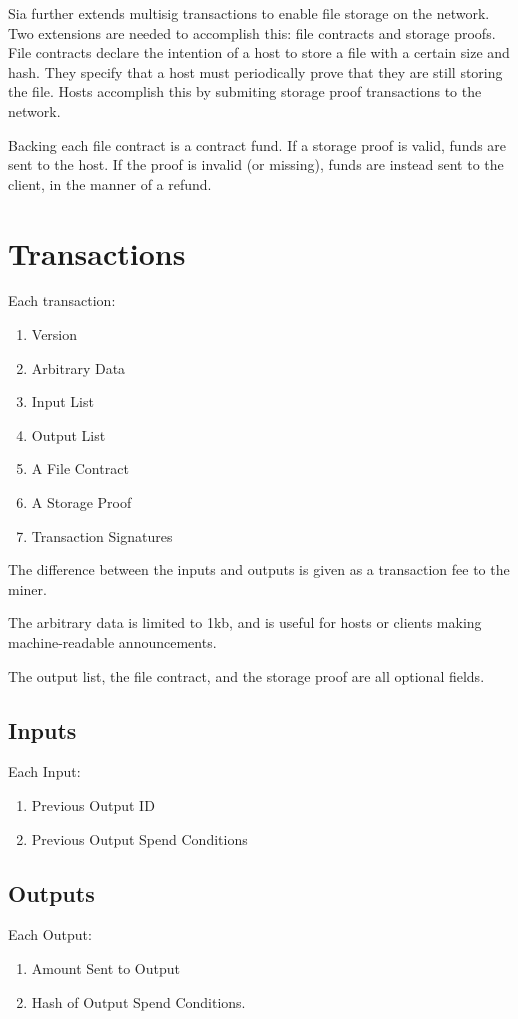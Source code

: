 \documentclass[twocolumn]{article}
\begin{document}
Sia further extends multisig transactions to enable file storage on the network.
Two extensions are needed to accomplish this: file contracts and storage proofs.
File contracts declare the intention of a host to store a file with a certain size and hash.
They specify that a host must periodically prove that they are still storing the file.
Hosts accomplish this by submiting storage proof transactions to the network.

Backing each file contract is a contract fund.
If a storage proof is valid, funds are sent to the host.
If the proof is invalid (or missing), funds are instead sent to the client, in the manner of a refund.

\section{Transactions}
Each transaction:
\begin{enumerate}
	\item Version
	\item Arbitrary Data
	\item Input List
	\item Output List
	\item A File Contract
	\item A Storage Proof
	\item Transaction Signatures
\end{enumerate}

The difference between the inputs and outputs is given as a transaction fee to the miner.

The arbitrary data is limited to 1kb, and is useful for hosts or clients making machine-readable announcements.

The output list, the file contract, and the storage proof are all optional fields.

\subsection{Inputs}
Each Input:
\begin{enumerate}
	\item Previous Output ID
	\item Previous Output Spend Conditions
\end{enumerate}

\subsection{Outputs}
Each Output:
\begin{enumerate}
	\item Amount Sent to Output
	\item Hash of Output Spend Conditions.
\end{enumerate}
\end{document}
